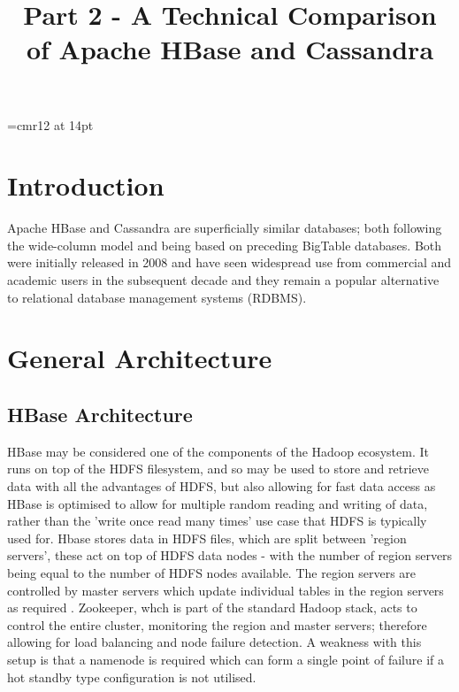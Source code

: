 \documentclass[10pt]{article}
\begin{document}
\newpage








%
\font\myfont=cmr12 at 14pt
\title{{\myfont Part 2 - A Technical Comparison of Apache HBase and Cassandra }}
\author{\vspace{-10ex}}
\date{\vspace{-10ex}}
\maketitle
\vspace{-1cm}
%





\section{Introduction}
Apache HBase and Cassandra are superficially similar databases; both following the wide-column model and being based on preceding BigTable databases. Both were initially released in 2008 and have seen widespread use from commercial and academic users in the subsequent decade and they remain a popular alternative to relational database management systems (RDBMS).

\section{General Architecture}
\subsection {HBase Architecture}
HBase may be considered one of the components of the Hadoop ecosystem. It runs on top of the HDFS filesystem, and so may be used to store and retrieve data with all the advantages of HDFS, but also allowing for fast data access as HBase is optimised to allow for multiple random reading and writing of data, rather than the 'write once read many times' use case that HDFS is typically used for.  Hbase stores data in HDFS files, which are split between 'region servers', these act on top of HDFS data nodes - with the number of region servers being equal to the number of HDFS nodes available. The region servers are controlled by master servers which update individual tables in the region servers as required \citep{6885425}. Zookeeper, whch is part of the standard Hadoop stack, acts to control the entire cluster, monitoring the region and master servers; therefore allowing for load balancing and node failure detection. A weakness with this setup is that a namenode is required which can form a single point of failure if a hot standby type configuration is not utilised.\\
\end{document}
